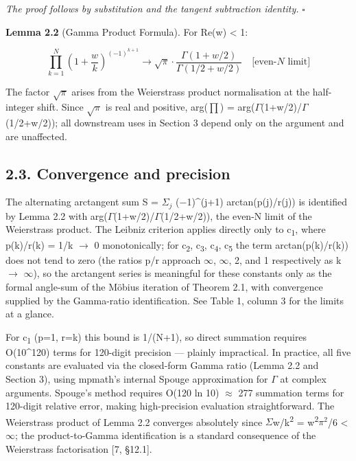 \documentclass[11pt]{article}
\begin{document}
\emph{The proof follows by substitution and the tangent subtraction
identity.} \(\square\)

\textbf{Lemma 2.2} (Gamma Product Formula). For Re(w) \textless{} 1:

\[\prod_{k=1}^{N} \left(1+\frac{w}{k}\right)^{(-1)^{k+1}} \to \sqrt{\pi} \cdot \frac{\Gamma(1+w/2)}{\Gamma(1/2+w/2)} \quad \text{[even-}N\text{ limit]}\]

The factor \(\sqrt{\pi}\) arises from the Weierstrass product
normalisation at the half-integer shift. Since \(\sqrt{\pi}\) is real
and positive, arg(\(\prod\)) =
arg(\(\Gamma\)(1+w/2)/\(\Gamma\)(1/2+w/2)); all downstream uses in
Section 3 depend only on the argument and are unaffected.

\hypertarget{convergence-and-precision}{%
\subsection{2.3. Convergence and
precision}\label{convergence-and-precision}}

The alternating arctangent sum S = \(\Sigma _{j}\) (−1)\^{}(j+1)
arctan(p(j)/r(j)) is identified by Lemma 2.2 with
arg(\(\Gamma\)(1+w/2)/\(\Gamma\)(1/2+w/2)), the even-N limit of the
Weierstrass product. The Leibniz criterion applies directly only to
c\textsubscript{1}, where p(k)/r(k) = 1/k \(\to\) 0 monotonically; for
c\textsubscript{2}, c\textsubscript{3}, c\textsubscript{4},
c\textsubscript{5} the term arctan(p(k)/r(k)) does not tend to zero (the
ratios p/r approach \(\infty\), \(\infty\), 2, and 1 respectively as k
\(\to\) \(\infty\)), so the arctangent series is meaningful for these
constants only as the formal angle-sum of the Möbius iteration of
Theorem 2.1, with convergence supplied by the Gamma-ratio
identification. See Table 1, column 3 for the limits at a glance.

For c\textsubscript{1} (p=1, r=k) this bound is 1/(N+1), so direct
summation requires O(10\^{}120) terms for 120-digit precision ---
plainly impractical. In practice, all five constants are evaluated via
the closed-form Gamma ratio (Lemma 2.2 and Section 3), using mpmath's
internal Spouge approximation for \(\Gamma\) at complex arguments.
Spouge's method requires O(120 ln 10) \(\approx\) 277 summation terms
for 120-digit relative error, making high-precision evaluation
straightforward. The Weierstrass product of Lemma 2.2 converges
absolutely since \(\Sigma\)\textbar w/k\textbar{}\textsuperscript{2} =
\textbar w\textbar{}\textsuperscript{2}\(\pi^{2}\)/6 \textless{}
\(\infty\); the product-to-Gamma identification is a standard
consequence of the Weierstrass factorisation {[}7, §12.1{]}.
\end{document}
